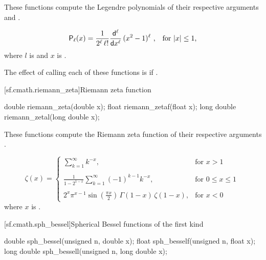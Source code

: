 \begin{itemdescr}
\pnum
\effects
These functions compute the Legendre polynomials of their
respective arguments
 and .

\pnum
\returns
\[ \mathsf{P}_\ell(x) =
     \frac{1}{2^\ell \, \ell!}
     \frac{\mathsf{d}^\ell}{\mathsf{d}x^\ell} \, (x^2 - 1) ^ \ell
     \text{ ,\quad for $|x| \le 1$,} \]
where
$l$ is  and
$x$ is .

\pnum
\remarks
The effect of calling each of these functions
is 
if .
\end{itemdescr}

[sf.cmath.riemann_zeta]{Riemann zeta function}%
%
%
%
%
\begin{itemdecl}
double       riemann_zeta(double x);
float        riemann_zetaf(float x);
long double  riemann_zetal(long double x);
\end{itemdecl}

\begin{itemdescr}

\pnum\effects
These functions compute the Riemann zeta function
of their respective arguments
.

\pnum\returns
\[%
  \mathsf{\zeta}(x) =
  \left\{
  \begin{array}{cl}
  \displaystyle
  \sum_{k=1}^\infty k^{-x},
  & \mbox{for $x > 1$}
  \\
  \\
  \displaystyle
  \frac{1}
	{1 - 2^{1-x}}
  \sum_{k=1}^\infty (-1)^{k-1} k^{-x},
  & \mbox{for $0 \le x \le 1$}
  \\
  \\
  \displaystyle
  2^x \pi^{x-1} \sin(\frac{\pi x}{2}) \, \Gamma(1-x) \, \zeta(1-x),
  & \mbox{for $x < 0$}
  \end{array}
  \right.
\;
\]
where
$x$ is .
\end{itemdescr}

[sf.cmath.sph_bessel]{Spherical Bessel functions of the first kind}%
%
%
%
%
%
\begin{itemdecl}
double       sph_bessel(unsigned n, double x);
float        sph_besself(unsigned n, float x);
long double  sph_bessell(unsigned n, long double x);
\end{itemdecl}

